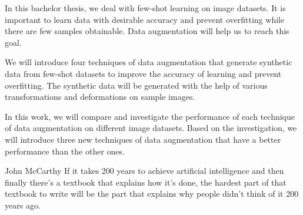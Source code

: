 In this bachelor thesis, we deal with few-shot learning on image datasets. It is important to learn data with desirable accuracy and prevent overfitting while there are few samples obtainable. Data augmentation will help us to reach this goal.

We will introduce four techniques of data augmentation that generate synthetic data from few-shot
datasets to improve the accuracy of learning and prevent overfitting. The synthetic data will be generated
with the help of various transformations and deformations on sample images.

In this work, we will compare and investigate the performance of each technique of data augmentation
on different image datasets. Based on the investigation, we will introduce three new techniques of
data augmentation that have a better performance than the other ones.

\begin{bigquote}{John McCarthy}
    If it takes 200 years to achieve artificial intelligence and then finally there's a textbook that explains how it's done, the hardest part of that textbook to write will be the part that explains why people didn't think of it 200 years ago.
\end{bigquote}

